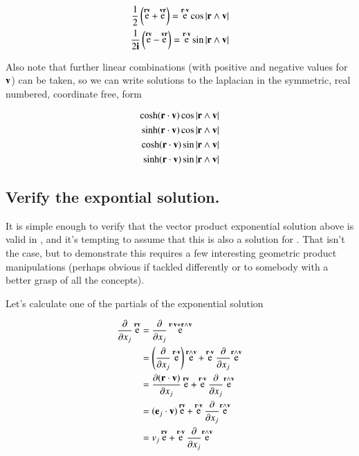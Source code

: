 \documentclass{article}      %
\newcommand{\dxj}[2] {\frac {\partial {#1}} {\partial {x_{#2}}}}
\DeclareMathOperator{\Exp}{e}
\begin{document}
\begin{align*}
\inv{2}\left(\Exp^{\Br\Bv} + \Exp^{\Bv\Br}\right) = \Exp^{\Br\cdot\Bv}\cos{\abs{\Br \wedge \Bv}} \\
\inv{2\Bi}\left(\Exp^{\Br\Bv} - \Exp^{\Bv\Br}\right) = \Exp^{\Br\cdot\Bv}\sin{\abs{\Br \wedge \Bv}} \\
\end{align*}

Also note that further linear combinations (with positive and negative values for $\mathbf{v}$) can be taken, so we can write solutions to the laplacian in 
the symmetric, real numbered, coordinate free, form

\begin{align*}
\cosh(\mathbf{r}\cdot\mathbf{v})\cos{\lvert{\mathbf{r}\wedge \mathbf{v}}\rvert} \\
\sinh(\mathbf{r}\cdot\mathbf{v})\cos{\lvert{\mathbf{r}\wedge \mathbf{v}}\rvert} \\
\cosh(\mathbf{r}\cdot\mathbf{v})\sin{\lvert{\mathbf{r}\wedge \mathbf{v}}\rvert} \\
\sinh(\mathbf{r}\cdot\mathbf{v})\sin{\lvert{\mathbf{r}\wedge \mathbf{v}}\rvert} \\
\end{align*}

\subsection{ Verify the expontial solution. }

It is simple enough to verify that the vector product exponential solution above is valid in , and it's tempting to assume that this
is also a solution for .  That isn't the case, but to demonstrate this requires a few interesting geometric product manipulations (perhaps
obvious if tackled differently or to somebody with a better grasp of all the concepts).

Let's calculate one of the partials of the exponential solution

\begin{align*}
\dxj{}{j}\Exp^{\Br\Bv} 
&= \dxj{}{j}\Exp^{\Br \cdot \Bv + \Br \wedge \Bv} \\
&= \left(\dxj{}{j}\Exp^{\Br \cdot \Bv}\right) \Exp^{\Br \wedge \Bv} + \Exp^{\Br \cdot \Bv}\dxj{}{j}{\Exp^{\Br \wedge \Bv}} \\
&= \dxj{(\Br \cdot \Bv)}{j}\Exp^{\Br\Bv} + \Exp^{\Br \cdot \Bv}\dxj{}{j}{\Exp^{\Br \wedge \Bv}} \\
&= (\Be_j \cdot \Bv)\Exp^{\Br\Bv} + \Exp^{\Br \cdot \Bv}\dxj{}{j}{\Exp^{\Br \wedge \Bv}} \\
&= v_j\Exp^{\Br\Bv} + \Exp^{\Br \cdot \Bv}\dxj{}{j}{\Exp^{\Br \wedge \Bv}} \\
\end{align*}
\end{document}
